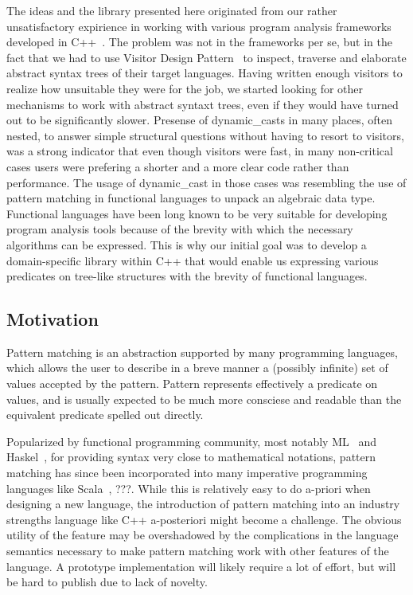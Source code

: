 \documentclass[submission,copyright]{eptcs}
\begin{document}
The ideas and the library presented here originated from our rather 
unsatisfactory expirience in working with various program analysis frameworks 
developed in C++~\cite{Pivot09,Phoenix,Clang,Lise}. The problem was not in the 
frameworks per se, but in the fact that we had to use Visitor Design Pattern~\cite{DesignPatterns1993} 
to inspect, traverse and elaborate abstract syntax trees of their target 
languages. Having written enough visitors to realize how unsuitable they were 
for the job, we started looking for other mechanisms to work with abstract 
syntaxt trees, even if they would have turned out to be significantly slower. 
Presense of dynamic\_casts in many places, often nested, to answer simple 
structural questions without having to resort to visitors, was a strong 
indicator that even though visitors were fast, in many non-critical cases 
users were prefering a shorter and a more clear code rather than performance.
The usage of dynamic\_cast in those cases was resembling the use of pattern 
matching in functional languages to unpack an algebraic data type. 
Functional languages have been long known to be very suitable for developing 
program analysis tools because of the brevity with which the necessary 
algorithms can be expressed. This is why our initial goal was to develop a 
domain-specific library within C++ that would enable us expressing various 
predicates on tree-like structures with the brevity of functional languages.

\subsection{Motivation}

Pattern matching is an abstraction supported by many programming languages, which 
allows the user to describe in a breve manner a (possibly infinite) set of 
values accepted by the pattern. Pattern represents effectively a predicate on 
values, and is usually expected to be much more consciese and readable than the 
equivalent predicate spelled out directly.

Popularized by functional programming community, most notably ML~\cite{ML90} and 
Haskel~\cite{Haskell98Book}, for providing syntax very close to mathematical 
notations, pattern matching has since been incorporated into many imperative 
programming languages like Scala~\cite{Scala2nd}, ???. While this is relatively 
easy to do a-priori when designing a new language, the introduction of pattern 
matching into an industry strengths language like C++ a-posteriori might become 
a challenge. The obvious utility of the feature may be overshadowed by the 
complications in the language semantics necessary to make pattern matching work 
with other features of the language. A prototype implementation will likely 
require a lot of effort, but will be hard to publish due to lack of novelty.
\end{document}

